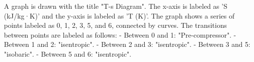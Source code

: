 A graph is drawn with the title "T-s Diagram". The x-axis is labeled as 'S (kJ/kg·K)' and the y-axis is labeled as 'T (K)'. The graph shows a series of points labeled as 0, 1, 2, 3, 5, and 6, connected by curves. The transitions between points are labeled as follows:  
- Between 0 and 1: "Pre-compressor".  
- Between 1 and 2: "isentropic".  
- Between 2 and 3: "isentropic".  
- Between 3 and 5: "isobaric".  
- Between 5 and 6: "isentropic".